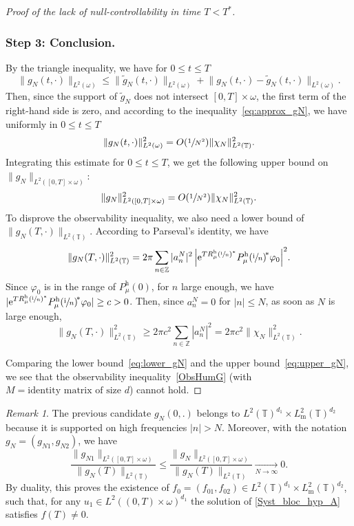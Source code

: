 \documentclass[JEP,XML,SOM,Unicode,NoEqCountersInSection]{cedram}
\theoremstyle{plain}
\theoremstyle{definition}
\theoremstyle{remark}
\newtheorem{remark}[theorem]{Remark}
\let\bigO O
\newcommand{\set}{\mathbb}
\newcommand{\T}{\set{T}}
\newcommand{\h}{{\mathrm h}}
\newcommand{\m}{{\mathrm m}}
\newcommand{\eu}{\mathrm e}
\newcommand{\iu}{\mathrm i}
\let\originalleft\left
\let\originalright\right
\renewcommand{\left}{\mathopen{}\mathclose\bgroup\originalleft}
\renewcommand{\right}{\aftergroup\egroup\originalright}
\newcommand{\iun}{\left(\sfrac{\iu}{n}\right)}
\begin{document}
\begin{proof}[Proof of the lack of null-controllability in time $T<T^*$]
\subsubsection*{Step 3: Conclusion.}
By the triangle inequality, we have for $0\leq t\leq T$
\[
\lVert g_N(t,\cdot)\rVert_{L^2(\omega)} \leq \lVert \widetilde g_N(t,\cdot)\rVert_{L^2(\omega)}
+\lVert g_N(t,\cdot)-\widetilde g_N(t,\cdot)\rVert_{L^2(\omega)}.
\]
Then, since the support of $\widetilde g_N$ does not intersect $[0,T]\times \omega$, the first term of the right-hand side is zero, and according to the inequality~\eqref{eq:approx_gN}, we have uniformly in $0\leq t\leq T$
\[
\lVert g_N(t,\cdot)\rVert_{L^2(\omega)}^2 =
\bigO\left(\sfrac 1{N^2}\right)\lVert\chi_N\rVert_{L^2(\set T)}^2.
\]
Integrating this estimate for $0\leq t\leq T$, we get the following upper bound on $\lVert g_N\rVert_{L^2([0,T]\times\omega)}$:
\begin{equation}
\label{eq:upper_gN}
\lVert g_N\rVert_{L^2([0,T]\times \omega)}^2 =
\bigO\left(\sfrac 1{N^2}\right)\lVert\chi_N\rVert_{L^2(\set T)}^2.
\end{equation}
To disprove the observability inequality, we also need a lower bound of $\| g_N(T,\cdot) \|_{L^2(\T)}$. According to Parseval's identity, we have
\[
\lVert g_N(T,\cdot)\rVert_{L^2(\set T)}^2
= 2\pi\sum_{n\in \set Z} |a_n^N|^2\,\left| \eu^{TR_\mu^\h\iun^* } P_\mu^\h\iun^{\!*} \varphi_0\right|^2.
\]
Since $\varphi_0$ is in the range of $P_\mu^\h(0)$, for $n$ large enough, we have $|\eu^{TR_\mu^\h\iun^* } P_\mu^\h\iun^{\!*}\varphi_0| \geq c>0$. Then, since $a_n^N = 0$ for $|n|\leq N$, as soon as $N$ is large enough,
\begin{equation}
\label{eq:lower_gN}
\lVert g_N(T,\cdot)\rVert_{L^2(\set T)}^2
\geq 2\pi c^2\sum_{n\in \set Z} |a_n^N|^2 = 2\pi c^2\lVert \chi_N\rVert_{L^2(\set T)}^2.
\end{equation}

Comparing the lower bound~\eqref{eq:lower_gN} and the upper bound~\eqref{eq:upper_gN}, we see that the observability inequality~\eqref{ObsHumG} (with $M = \text{identity matrix of size } d$) cannot hold.
\end{proof}

\begin{remark} \label{Rk_moy0}
The previous candidate $g_N(0,.)$ belongs to $L^2(\T)^{d_1} \times L^2_\m(\T)^{d_2}$ because it is supported on high frequencies $|n|>N$.
Moreover, with the notation $g_N=(g_{N1},g_{N2})$, we have
$$\frac{\lVert g_{N1}\rVert_{L^2([0,T]\times \omega)}}{\lVert g_N(T)\rVert_{L^2(\set T)}}
\leqslant
\frac{\lVert g_{N}\rVert_{L^2([0,T]\times \omega)}}{\lVert g_N(T)\rVert_{L^2(\set T)}}
\underset{N \to \infty}{\longrightarrow} 0.$$
By duality, this proves the existence of
$f_0=(f_{01},f_{02})\in L^2(\T)^{d_1} \times L^2_\m(\T)^{d_2}$, such that, for any $u_1 \in L^2((0,T)\times\omega)^{d_1}$ the solution of \eqref{Syst_bloc_hyp_A} satisfies $f(T) \neq 0$.
\end{remark}
\end{document}
